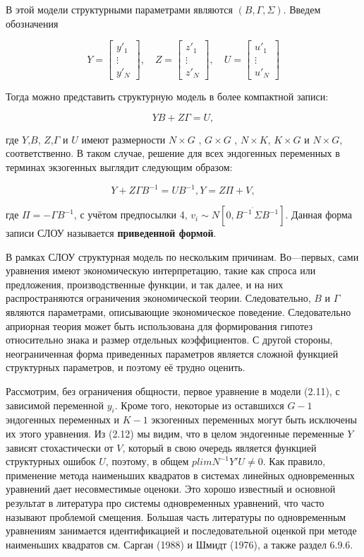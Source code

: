 В этой модели структурными параметрами являются  $(B,\Gamma,\Sigma)$. Введем обозначения

\[
Y=\begin{bmatrix} y'_{1} \\ \vdots \\ y'_{N} \end{bmatrix}, \quad  Z=\begin{bmatrix} z'_{1} \\ \vdots \\ z'_{N} \end{bmatrix}, \quad U=\begin{bmatrix} u'_{1} \\ \vdots \\ u'_{N} \end{bmatrix}
\]

Тогда можно представить структурную модель в более компактной записи:

\begin{equation}
YB+Z\Gamma=U,
\end{equation}

где $Y$,$B$, $Z$,$\Gamma$ и $U$ имеют размерности $N \times G$ , $G \times G$ , $ N \times K$, $K \times G$ и $N \times G$, соответственно. В таком случае, решение для всех эндогенных переменных в терминах экзогенных выглядит следующим образом:


\begin{equation}
Y+Z\Gamma B^{-1}=UB^{-1},
Y=Z\Pi+V,
\end{equation}

где $\Pi= -\Gamma B^{-1}$, с учётом предпосылки 4, $v_{i} \sim N[0,B^{-1^{'}} \Sigma B^{-1}]$. Данная форма записи СЛОУ называется \textbf{приведенной формой}.


	В рамках СЛОУ структурная модель  по нескольким причинам. Во---первых, сами уравнения имеют экономическую интерпретацию, такие как спроса или предложения, производственные функции, и так далее, и на них распространяются ограничения экономической теории. Следовательно, $B$ и $\Gamma$ являются параметрами, описывающие экономическое поведение. Следовательно априорная теория может быть использована для формирования гипотез относительно знака и размер отдельных коэффициентов. С другой стороны, неограниченная форма приведенных параметров является сложной функцией структурных параметров, и поэтому её трудно оценить.  

	
	Рассмотрим, без ограничения общности, первое уравнение в модели (2.11), с зависимой переменной $y_{i}$. Кроме того, некоторые из оставшихся $G-1$ эндогенных переменных и $K-1$ экзогенных переменных могут быть исключены их этого уравнения. Из (2.12) мы видим, что в целом эндогенные переменные $Y$ зависят стохастически от $V$, который в свою очередь является функцией структурных ошибок $U$, поэтому, в общем $plim N^{-1}Y'U\not=0$. Как правило, применение метода наименьших квадратов в системах линейных одновременных уравнений дает несовместимые оценоки. Это хорошо известный и основной результат в литература про системы одновременных уравнений, что часто называют проблемой смещения. Большая часть литературы по одновременным уравнениям занимается идентификацией и последовательной оценкой при методе наименьших квадратов см. Сарган (1988) и Шмидт (1976), а также раздел 6.9.6. 
	
